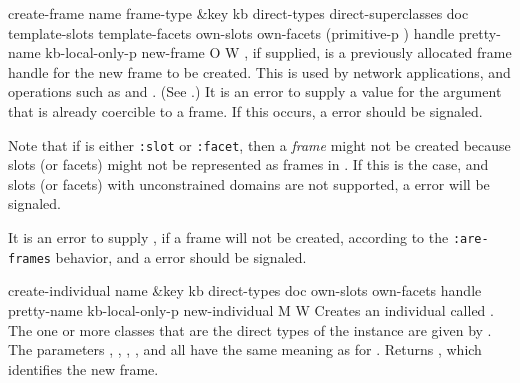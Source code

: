 \begin{okbcop}{create-frame}{ name frame-type \&key kb direct-types direct-superclasses doc template-slots template-facets own-slots own-facets (primitive-p \true) handle pretty-name kb-local-only-p} { new-frame } { O } { W } {  }
   , if supplied, is a previously allocated frame handle for the
   new frame to be created.  This is used by network applications, and
   operations such as  and .  (See
   .)  It is an error to supply a value for the
    argument that is already coercible to a frame.  If this
   occurs, a  error should be signaled.

   Note that if  is either {\tt :slot} or {\tt :facet},
   then a {\em frame} might not be created because slots (or facets) might not
   be represented as frames in .  If this is the case, and slots
   (or facets) with unconstrained domains are not supported, a
    error will be signaled.

   It is an error to supply ,  if a frame
   will not be created, according to the {\tt :are-frames} behavior, and a
    error should be signaled.
\end{okbcop}

\begin{okbcop}{create-individual}{ name \&key kb direct-types doc own-slots own-facets handle pretty-name kb-local-only-p} { new-individual } { M } { W } {  }
Creates an individual called .  The one or more classes 
   that are the direct types of the instance are given by
   .  
   The parameters , , ,
   , and  all have the same meaning as for
   .  Returns , which identifies the
   new frame.
\end{okbcop}


